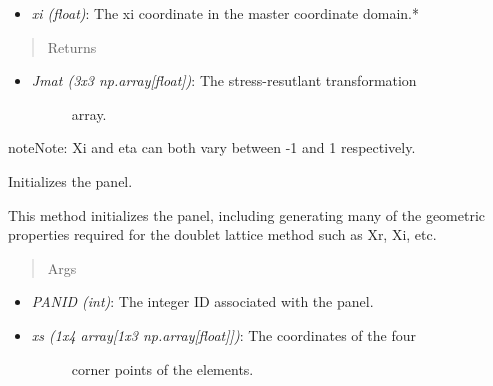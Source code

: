 \documentclass[letterpaper,10pt,english]{sphinxmanual}
\begin{document}
\begin{fulllineitems}
\begin{fulllineitems}
\begin{itemize}
\item {} 
\emph{xi (float)}: The xi coordinate in the master coordinate domain.*

\end{itemize}
\begin{quote}\begin{description}
\item[{Returns}] \leavevmode
\end{description}\end{quote}
\begin{itemize}
\item {} \begin{description}
\item[{\emph{Jmat (3x3 np.array{[}float{]})}: The stress-resutlant transformation}] \leavevmode
array.

\end{description}

\end{itemize}

\begin{notice}{note}{Note:}
Xi and eta can both vary between -1 and 1 respectively.
\end{notice}

\end{fulllineitems}


\begin{fulllineitems}
\label{aerodynamics:AeroComBAT.Aerodynamics.CQUADA.__init__}
Initializes the panel.

This method initializes the panel, including generating many of the
geometric properties required for the doublet lattice method such as
Xr, Xi, etc.
\begin{quote}\begin{description}
\item[{Args}] \leavevmode
\end{description}\end{quote}
\begin{itemize}
\item {} 
\emph{PANID (int)}: The integer ID associated with the panel.

\item {} \begin{description}
\item[{\emph{xs (1x4 array{[}1x3 np.array{[}float{]}{]})}: The coordinates of the four}] \leavevmode
corner points of the elements.


\end{description}
\end{itemize}
\end{fulllineitems}
\end{fulllineitems}
\end{document}
